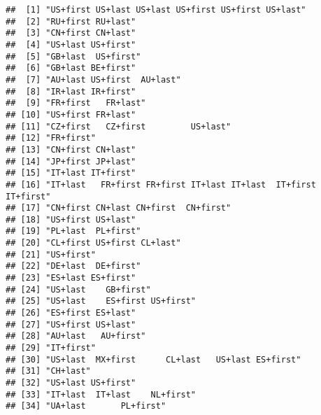 \documentclass[
]{article}
\begin{document}
\begin{verbatim}
##  [1] "US+first US+last US+last US+first US+first US+last"                
##  [2] "RU+first RU+last"                                                  
##  [3] "CN+first CN+last"                                                  
##  [4] "US+last US+first"                                                  
##  [5] "GB+last  US+first"                                                 
##  [6] "GB+last BE+first"                                                  
##  [7] "AU+last US+first  AU+last"                                         
##  [8] "IR+last IR+first"                                                  
##  [9] "FR+first   FR+last"                                                
## [10] "US+first FR+last"                                                  
## [11] "CZ+first   CZ+first         US+last"                               
## [12] "FR+first"                                                          
## [13] "CN+first CN+last"                                                  
## [14] "JP+first JP+last"                                                  
## [15] "IT+last IT+first"                                                  
## [16] "IT+last   FR+first FR+first IT+last IT+last  IT+first     IT+first"
## [17] "CN+first CN+last CN+first  CN+first"                               
## [18] "US+first US+last"                                                  
## [19] "PL+last  PL+first"                                                 
## [20] "CL+first US+first CL+last"                                         
## [21] "US+first"                                                          
## [22] "DE+last  DE+first"                                                 
## [23] "ES+last ES+first"                                                  
## [24] "US+last    GB+first"                                               
## [25] "US+last    ES+first US+first"                                      
## [26] "ES+first ES+last"                                                  
## [27] "US+first US+last"                                                  
## [28] "AU+last   AU+first"                                                
## [29] "IT+first"                                                          
## [30] "US+last  MX+first      CL+last   US+last ES+first"                 
## [31] "CH+last"                                                           
## [32] "US+last US+first"                                                  
## [33] "IT+last  IT+last    NL+first"                                      
## [34] "UA+last       PL+first"                                            

\end{verbatim}
\end{document}
